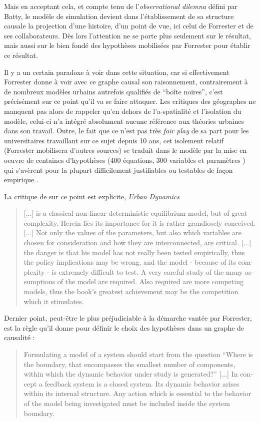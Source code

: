 Mais en acceptant cela, et compte tenu de l'\textit{observational dilemna} défini par Batty, le modèle de simulation devient dans l'établissement de sa structure causale la projection d'une histoire, d'un point de vue, ici celui de Forrester et de ses collaborateurs. Dès lors l'attention ne se porte plus seulement sur le résultat, mais aussi sur le bien fondé des hypothèses mobilisées par Forrester pour établir ce résultat.

Il y a un certain paradoxe à voir dans cette situation, car si effectivement Forrester donne à voir avec ce graphe causal son raisonnement, contrairement à de nombreux modèles urbains autrefois qualifiés de \enquote{boîte noires}, c'est précisément sur ce point qu'il va se faire attaquer. Les critiques des géographes ne manquent pas alors de rappeler qu'en dehors de l'a-spatialité et l'isolation du modèle, celui-ci n'a intégré absolument aucune référence aux théories urbaines dans son travail. Outre, le fait que ce n'est pas très \textit{fair play} de sa part pour les universitaires travaillant sur ce sujet depuis 10 ans, cet isolement relatif (Forrester mobilisera d'autres sources) se traduit dans le modèle par la mise en oeuvre de centaines d'hypothèses (400 équations, 300 variables et paramètres \autocite[63]{Pumain1989}) qui s'avèrent pour la plupart difficilement justifiables ou testables de façon empirique \autocite[307]{Batty1976}.

La critique de \textcite{Tobler1970a} sur ce point est explicite, \textit{Urban Dynamics}

\foreignblockquote{english}[\cite{Tobler1970a}]{[...] is a classical non-linear deterministic equilibrium model, but of great complexity. Herein lies its importance for it is rather grandiosely conceived. [...] Not only the values of the parameters, but also which variables are chosen for consideration and how they are interconnected, are critical. [...] the danger is that his model has not really been tested empirically, thus the policy implications may be wrong, and the model - because of its complexity - is extremely difficult to test. A very careful study of the many assumptions of the model are required. Also required are more competing models, thus the book’s greatest achievement may be the competition which it stimulates.}

Dernier point, peut-être le plus préjudiciable à la démarche vantée par Forrester, est la règle qu'il donne pour définir le choix des hypothèses dans un graphe de causalité :

\foreignblockquote{english}[\cites{Forrester1968b, Richardson2011}]{Formulating a model of a system should start from the question \enquote{Where is the boundary, that encompasses the smallest number of components, within which the dynamic behavior under study is generated?} [...] In concept a feedback system is a closed system. Its dynamic behavior arises within its internal structure. Any action which is essential to the behavior of the model being investigated must be included inside the system boundary.}

